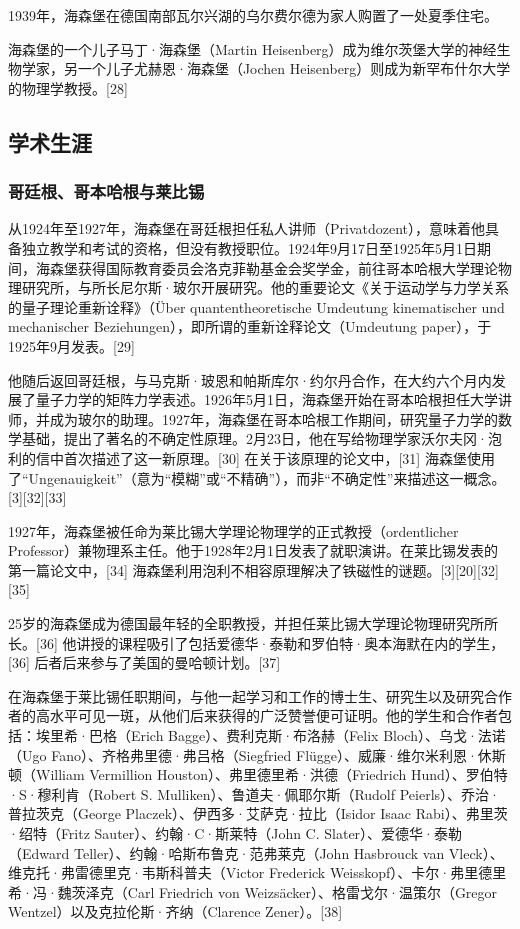 1939年，海森堡在德国南部瓦尔兴湖的乌尔费尔德为家人购置了一处夏季住宅。  

海森堡的一个儿子马丁·海森堡（Martin Heisenberg）成为维尔茨堡大学的神经生物学家，另一个儿子尤赫恩·海森堡（Jochen Heisenberg）则成为新罕布什尔大学的物理学教授。[28]  
\subsection{学术生涯}  
\subsubsection{哥廷根、哥本哈根与莱比锡}  
从1924年至1927年，海森堡在哥廷根担任私人讲师（Privatdozent），意味着他具备独立教学和考试的资格，但没有教授职位。1924年9月17日至1925年5月1日期间，海森堡获得国际教育委员会洛克菲勒基金会奖学金，前往哥本哈根大学理论物理研究所，与所长尼尔斯·玻尔开展研究。他的重要论文《关于运动学与力学关系的量子理论重新诠释》（Über quantentheoretische Umdeutung kinematischer und mechanischer Beziehungen），即所谓的重新诠释论文（Umdeutung paper），于1925年9月发表。[29]  

他随后返回哥廷根，与马克斯·玻恩和帕斯库尔·约尔丹合作，在大约六个月内发展了量子力学的矩阵力学表述。1926年5月1日，海森堡开始在哥本哈根担任大学讲师，并成为玻尔的助理。1927年，海森堡在哥本哈根工作期间，研究量子力学的数学基础，提出了著名的不确定性原理。2月23日，他在写给物理学家沃尔夫冈·泡利的信中首次描述了这一新原理。[30] 在关于该原理的论文中，[31] 海森堡使用了“Ungenauigkeit”（意为“模糊”或“不精确”），而非“不确定性”来描述这一概念。[3][32][33]  

1927年，海森堡被任命为莱比锡大学理论物理学的正式教授（ordentlicher Professor）兼物理系主任。他于1928年2月1日发表了就职演讲。在莱比锡发表的第一篇论文中，[34] 海森堡利用泡利不相容原理解决了铁磁性的谜题。[3][20][32][35]  

25岁的海森堡成为德国最年轻的全职教授，并担任莱比锡大学理论物理研究所所长。[36] 他讲授的课程吸引了包括爱德华·泰勒和罗伯特·奥本海默在内的学生，[36] 后者后来参与了美国的曼哈顿计划。[37]  

在海森堡于莱比锡任职期间，与他一起学习和工作的博士生、研究生以及研究合作者的高水平可见一斑，从他们后来获得的广泛赞誉便可证明。他的学生和合作者包括：埃里希·巴格（Erich Bagge）、费利克斯·布洛赫（Felix Bloch）、乌戈·法诺（Ugo Fano）、齐格弗里德·弗吕格（Siegfried Flügge）、威廉·维尔米利恩·休斯顿（William Vermillion Houston）、弗里德里希·洪德（Friedrich Hund）、罗伯特·S·穆利肯（Robert S. Mulliken）、鲁道夫·佩耶尔斯（Rudolf Peierls）、乔治·普拉茨克（George Placzek）、伊西多·艾萨克·拉比（Isidor Isaac Rabi）、弗里茨·绍特（Fritz Sauter）、约翰·C·斯莱特（John C. Slater）、爱德华·泰勒（Edward Teller）、约翰·哈斯布鲁克·范弗莱克（John Hasbrouck van Vleck）、维克托·弗雷德里克·韦斯科普夫（Victor Frederick Weisskopf）、卡尔·弗里德里希·冯·魏茨泽克（Carl Friedrich von Weizsäcker）、格雷戈尔·温策尔（Gregor Wentzel）以及克拉伦斯·齐纳（Clarence Zener）。[38]  

